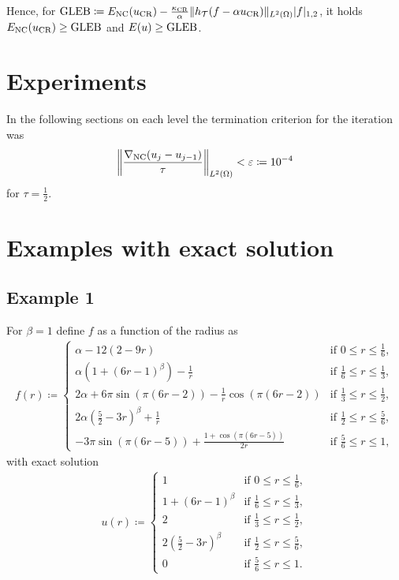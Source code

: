 \documentclass[draft=false,twoside,12pt]{scrreprt}
\begin{document}
Hence, for $\textup{GLEB} \coloneqq 
  E_\textup{NC}(u_\textup{CR}) - \frac{\kappa_{\textup{CR}}}{\alpha}\Vert
  h_\mathcal{T}(f-\alpha u_\textup{CR})\Vert_{L^2(\Omega)} |f|_{1,2}$, it holds
  $E_\textup{NC}(u_\textup{CR})\geq \textup{GLEB}$ and $E(u)\geq \textup{GLEB}$.

\section{Experiments}
In the following sections on each level the termination criterion for the
iteration was
\begin{align*}
  \left\Vert \frac{\nabla_\textup{NC} (u_{j}-u_{j-1})}{\tau}  \right\Vert_{L^2(\Omega)}
  <\varepsilon\coloneqq 10^{-4}
\end{align*}
for $\tau=\frac{1}{2}$.

\section{Examples with exact solution}
\subsection{Example 1}
For $\beta=1$ define $f$ as a function of the radius as
\begin{align}
  \label{equ:f01}
  f(r)\coloneqq 
  \begin{cases}
    \alpha-12(2-9r) & \text{if } 0\leq r\leq\frac{1}{6},\\
    \alpha(1+(6r-1)^\beta)-\frac{1}{r} & \text{if } \frac{1}{6}\leq r\leq
    \frac{1}{3},\\
    2\alpha+6\pi\sin(\pi(6r-2))-\frac{1}{r}\cos(\pi(6r-2)) &
    \text{if } \frac{1}{3}\leq r\leq\frac{1}{2},\\
    2\alpha(\frac{5}{2}-3r)^\beta+\frac{1}{r}&
    \text{if } \frac{1}{2}\leq r\leq\frac{5}{6},\\
    -3\pi\sin(\pi(6r-5))+\frac{1+\cos(\pi(6r-5))}{2r} &
    \text{if } \frac{5}{6}\leq r\leq 1,
  \end{cases}
\end{align}
with exact solution
\begin{align}
  \label{equ:f01exactSol}
  u(r)\coloneqq
  \begin{cases}
    1 & \text{if } 0\leq r\leq\frac{1}{6},\\
    1+(6r-1)^\beta & \text{if } \frac{1}{6}\leq r\leq
    \frac{1}{3},\\
    2 &
    \text{if } \frac{1}{3}\leq r\leq\frac{1}{2},\\
    2(\frac{5}{2}-3r)^\beta &
    \text{if } \frac{1}{2}\leq r\leq\frac{5}{6},\\
    0 &
    \text{if } \frac{5}{6}\leq r\leq 1.
  \end{cases}
\end{align}
\end{document}
